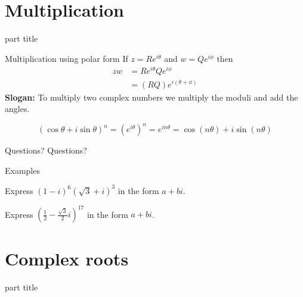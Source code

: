 \documentclass{beamer}
\begin{document}
\section{Multiplication}

\begin{frame}
\begin{beamercolorbox}[sep=12pt,center]{part title}
\insertsection\par
\end{beamercolorbox}
\end{frame}

\begin{frame}{Multiplication using polar form}
If $z=Re^{i\theta}$ and $w=Qe^{i\phi}$ then
\begin{align*}
zw&=Re^{i\theta}Qe^{i\phi}\\
 &= (RQ)e^{i(\theta+\phi)}
\end{align*}\vfill
{\bf Slogan:} To multiply two complex numbers we multiply the moduli and add the angles.\vfill
\begin{theorem}
	\begin{equation*}
	(\cos\theta+i\sin\theta)^n = (e^{i\theta})^n = e^{in\theta} = \cos(n\theta)+i\sin(n\theta)
	\end{equation*}
	\end{theorem}
\end{frame}

\begin{frame}{Questions?}
Questions?
\end{frame}

\begin{frame}{Examples}
\begin{example}
Express $(1-i)^6(\sqrt{3}+i)^3$ in the form $a+bi$. %
\end{example}
\begin{example}
Express $(\frac{1}{2}-\frac{\sqrt{3}}{2}i)^{17}$ in the form $a+bi$. %
\end{example}
\end{frame}

\section{Complex roots}

\begin{frame}
\begin{beamercolorbox}[sep=12pt,center]{part title}
\insertsection\par
\end{beamercolorbox}
\end{frame}
\end{document}
